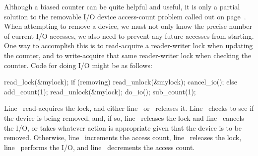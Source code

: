 \QuickQuizEnd

Although a biased counter can be quite helpful and useful, it is only a
partial solution to the removable I/O device access-count problem
called out on
page~\pageref{chp:Counting}.
When attempting to remove a device, we must not only know the precise
number of current I/O accesses, we also need to prevent any future
accesses from starting.
One way to accomplish this is to read-acquire a reader-writer lock
when updating the counter, and to write-acquire that same reader-writer
lock when checking the counter.
Code for doing I/O might be as follows:

\begin{fcvlabel}
\begin{VerbatimN}[commandchars=\\\[\]]
read_lock(&mylock);		\lnlbl[acq]
if (removing) {			\lnlbl[check]
	read_unlock(&mylock);	\lnlbl[rel1]
	cancel_io();		\lnlbl[cancel]
} else {
	add_count(1);		\lnlbl[inc]
	read_unlock(&mylock);	\lnlbl[rel2]
	do_io();		\lnlbl[do]
	sub_count(1);		\lnlbl[dec]
}
\end{VerbatimN}
\end{fcvlabel}

\begin{fcvref}
Line~ read-acquires the lock, and either
line~ or~ releases it.
Line~ checks to see if the device is being removed, and, if so,
line~ releases the lock and
line~ cancels the I/O, or takes whatever
action is appropriate given that the device is to be removed.
Otherwise, line~ increments the access count,
line~ releases the
lock, line~ performs the I/O, and
line~ decrements the access count.
\end{fcvref}

\QuickQuizEnd

